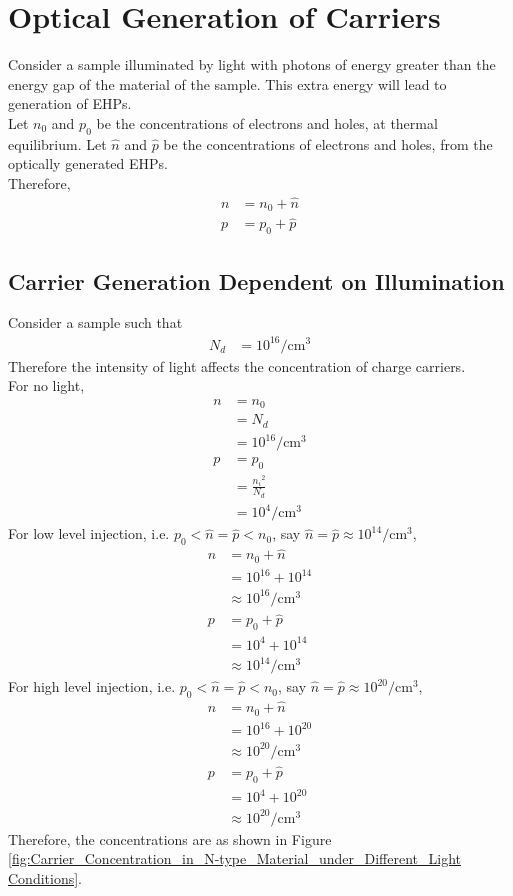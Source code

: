 \documentclass[titlepage, fleqn, a4paper, 12pt, twoside]{article}
\theoremstyle{definition}
\theoremstyle{theorem}
\let\Oldsection\section
\renewcommand{\section}{\FloatBarrier\Oldsection}
\let\Oldsubsection\subsection
\renewcommand{\subsection}{\FloatBarrier\Oldsubsection}
\begin{document}
\section{Optical Generation of Carriers}

Consider a sample illuminated by light with photons of energy greater than the energy gap of the material of the sample.
This extra energy will lead to generation of EHPs.\\
Let $n_0$ and $p_0$ be the concentrations of electrons and holes, at thermal equilibrium.
Let $\hat{n}$ and $\hat{p}$ be the concentrations of electrons and holes, from the optically generated EHPs.\\
Therefore,
\begin{align*}
	n &= n_0 + \hat{n}\\
	p &= p_0 + \hat{p}
\end{align*}

\subsection{Carrier Generation Dependent on Illumination}

Consider a sample such that
\begin{align*}
	N_d &= 10^{16} \si{\per\centi\metre\cubed}
\end{align*}
Therefore the intensity of light affects the concentration of charge carriers.\\
For no light,
\begin{align*}
	n &= n_0\\
	&= N_d\\
	&= 10^{16} \si{\per\centi\metre\cubed}\\
	p &= p_0\\
	&= \frac{{n_i}^2}{N_d}\\
	&= 10^4 \si{\per\centi\metre\cubed}
\end{align*}
For low level injection, i.e. ${p_0 < \hat{n} = \hat{p} < n_0}$, say $\hat{n} = \hat{p} \approx 10^{14} \si{\per\centi\metre\cubed}$,
\begin{align*}
	n &= n_0 + \hat{n}\\
	&= 10^{16} + 10^{14}\\
	&\approx 10^{16} \si{\per\centi\metre\cubed}\\
	p &= p_0 + \hat{p}\\
	&= 10^4 + 10^{14}\\
	&\approx 10^{14} \si{\per\centi\metre\cubed}
\end{align*}
For high level injection, i.e. ${p_0 < \hat{n} = \hat{p} < n_0}$, say $\hat{n} = \hat{p} \approx 10^{20} \si{\per\centi\metre\cubed}$,
\begin{align*}
	n &= n_0 + \hat{n}\\
	&= 10^{16} + 10^{20}\\
	&\approx 10^{20} \si{\per\centi\metre\cubed}\\
	p &= p_0 + \hat{p}\\
	&= 10^4 + 10^{20}\\
	&\approx 10^{20} \si{\per\centi\metre\cubed}
\end{align*}
Therefore, the concentrations are as shown in Figure \ref{fig:Carrier_Concentration_in_N-type_Material_under_Different_Light Conditions}.
\end{document}
